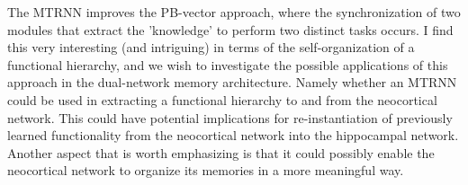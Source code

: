 The MTRNN improves the PB-vector approach, where the synchronization of two modules that extract the 'knowledge' to perform two distinct tasks occurs. I find this very interesting (and intriguing) in terms of the self-organization of a functional hierarchy, and we wish to investigate the possible applications of this approach in the dual-network memory architecture. Namely whether an MTRNN could be used in extracting a functional hierarchy to and from the neocortical network. This could have potential implications for re-instantiation of previously learned functionality from the neocortical network into the hippocampal network. Another aspect that is worth emphasizing is that it could possibly enable the neocortical network to organize its memories in a more meaningful way.


\cleardoublepage